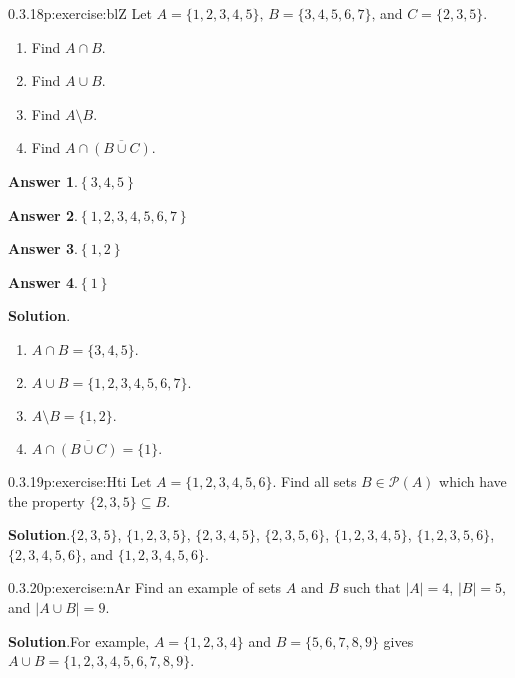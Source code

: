 \documentclass[twoside,11pt,]{book}
\newcommand{\blocktitlefont}{\relax}
\numberwithin{equation}{chapter}
\newcommand{\pow}{\mathcal P}
\begin{document}
\begin{divisionsolution}{0.3.18}{}{p:exercise:blZ}%
Let \(A = \{1,2,3,4,5\}\text{,}\) \(B = \{3,4,5,6,7\}\text{,}\) and \(C = \{2,3,5\}\text{.}\)%
\begin{enumerate}[label=(\alph*)]
\item{}Find \(A \cap B\text{.}\)%
\item{}Find \(A \cup B\text{.}\)%
\item{}Find \(A \setminus B\text{.}\)%
\item{}Find \(A \cap \overline{(B \cup C)}\text{.}\)%
\end{enumerate}
%
\par\smallskip%
\noindent\textbf{\blocktitlefont Answer 1}.\quad{}\(\left\{3,4,5\right\}\)%
\par\smallskip%
\noindent\textbf{\blocktitlefont Answer 2}.\quad{}\(\left\{1,2,3,4,5,6,7\right\}\)%
\par\smallskip%
\noindent\textbf{\blocktitlefont Answer 3}.\quad{}\(\left\{1,2\right\}\)%
\par\smallskip%
\noindent\textbf{\blocktitlefont Answer 4}.\quad{}\(\left\{1\right\}\)%
\par\smallskip%
\noindent\textbf{\blocktitlefont Solution}.\quad{}%
\begin{enumerate}[label=(\alph*)]
\item{}\(A \cap B = \{3,4,5\}\text{.}\)%
\item{}\(A \cup B = \{1,2,3,4,5,6,7\}\text{.}\)%
\item{}\(A \setminus B = \{1,2\}\text{.}\)%
\item{}\(A \cap \overline{(B \cup C)} = \{1\}\text{.}\)%
\end{enumerate}
%
\end{divisionsolution}%
\begin{divisionsolution}{0.3.19}{}{p:exercise:Hti}%
Let \(A = \{1,2,3,4,5,6\}\). Find all sets \(B \in \pow(A)\) which have the property \(\{2,3,5\} \subseteq B\).%
\par\smallskip%
\noindent\textbf{\blocktitlefont Solution}.\quad{}\(\{2,3,5\}\), \(\{1,2,3,5\}\), \(\{2,3,4,5\}\), \(\{2,3,5,6\}\), \(\{1,2,3,4,5\}\), \(\{1,2,3,5,6\}\), \(\{2,3,4,5,6\}\), and \(\{1,2,3,4,5,6\}\).%
\end{divisionsolution}%
\begin{divisionsolution}{0.3.20}{}{p:exercise:nAr}%
Find an example of sets \(A\) and \(B\) such that \(|A| = 4\), \(|B| = 5\), and \(|A \cup B| = 9\).%
\par\smallskip%
\noindent\textbf{\blocktitlefont Solution}.\quad{}For example, \(A = \{1,2,3,4\}\) and \(B = \{5,6,7,8,9\}\) gives \(A \cup B = \{1,2,3,4,5,6,7,8,9\}\).%
\end{divisionsolution}%
\end{document}
